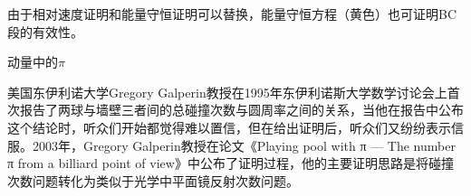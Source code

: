 \begin{problemset}
	由于相对速度证明和能量守恒证明可以替换，能量守恒方程（黄色）也可证明BC段的有效性。
	\newpage
	\item 动量中的$\pi$
	
	美国东伊利诺大学Gregory Galperin教授在1995年东伊利诺斯大学数学讨论会上首次报告了两球与墙壁三者间的总碰撞次数与圆周率之间的关系，当他在报告中公布这个结论时，听众们开始都觉得难以置信，但在给出证明后，听众们又纷纷表示信服。2003年，Gregory Galperin教授在论文《Playing pool with π — The number π from a billiard point of view》中公布了证明过程，他的主要证明思路是将碰撞次数问题转化为类似于光学中平面镜反射次数问题。

	
\end{problemset}
